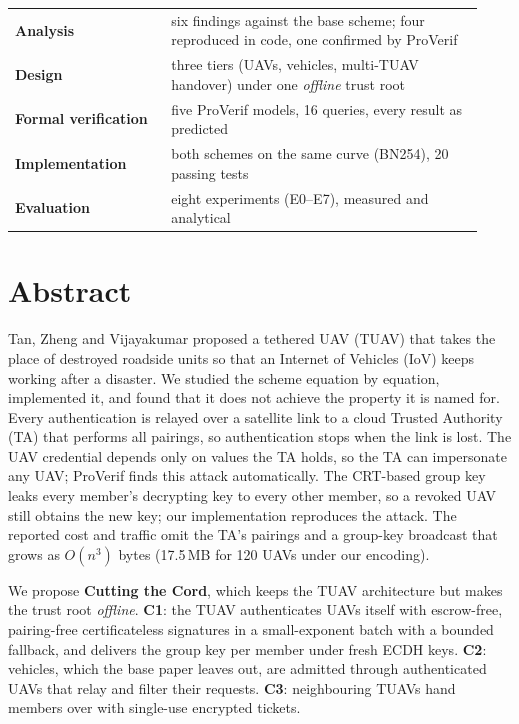 \documentclass[11pt,a4paper,openany]{report}
\begin{document}
\begin{titlepage}
\vspace{0.5cm}
\begin{tcolorbox}[enhanced,colback=soft,colframe=deep,boxrule=0.5pt,arc=2mm,title={\sffamily\bfseries What this report delivers},fonttitle=\sffamily\bfseries]
\small
\begin{tabular}{@{}p{0.31\linewidth}p{0.62\linewidth}@{}}
\textbf{Analysis} & six findings against the base scheme; four reproduced in code, one confirmed by ProVerif\\
\textbf{Design} & three tiers (UAVs, vehicles, multi-TUAV handover) under one \emph{offline} trust root\\
\textbf{Formal verification} & five ProVerif models, 16 queries, every result as predicted\\
\textbf{Implementation} & both schemes on the same curve (BN254), 20 passing tests\\
\textbf{Evaluation} & eight experiments (E0--E7), measured and analytical\\
\end{tabular}
\end{tcolorbox}
\end{titlepage}

\chapter*{Abstract}
Tan, Zheng and Vijayakumar proposed a tethered UAV (TUAV) that takes the place of destroyed roadside units so that an Internet of Vehicles (IoV) keeps
working after a disaster. We studied the scheme equation by equation, implemented it, and found that it does not achieve the property it is named for.
Every authentication is relayed over a satellite link to a cloud Trusted Authority (TA) that performs all pairings, so authentication stops when the
link is lost. The UAV credential depends only on values the TA holds, so the TA can impersonate any UAV; ProVerif finds this attack automatically.
The CRT-based group key leaks every member's decrypting key to every other member, so a revoked UAV still obtains the new key; our implementation
reproduces the attack. The reported cost and traffic omit the TA's pairings and a group-key broadcast that grows as $O(n^3)$ bytes
(17.5\,MB for 120 UAVs under our encoding).

We propose \textbf{Cutting the Cord}, which keeps the TUAV architecture but makes the trust root \emph{offline}. \textbf{C1}: the TUAV
authenticates UAVs itself with escrow-free, pairing-free certificateless signatures in a small-exponent batch with a bounded fallback, and
delivers the group key per member under fresh ECDH keys. \textbf{C2}: vehicles, which the base paper leaves out, are admitted through authenticated
UAVs that relay and filter their requests. \textbf{C3}: neighbouring TUAVs hand members over with single-use encrypted tickets.
\end{document}
